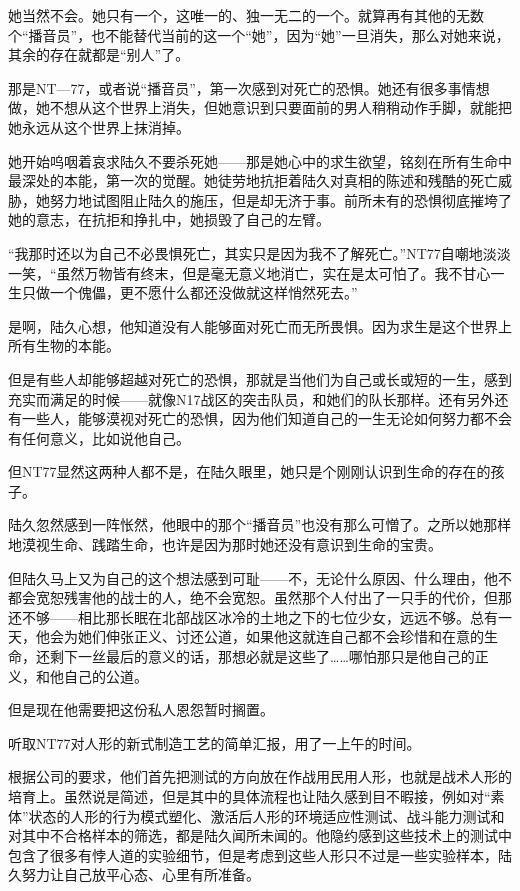 她当然不会。她只有一个，这唯一的、独一无二的一个。就算再有其他的无数个“播音员”，也不能替代当前的这一个“她”，因为“她”一旦消失，那么对她来说，其余的存在就都是“别人”了。

那是NT—77，或者说“播音员”，第一次感到对死亡的恐惧。她还有很多事情想做，她不想从这个世界上消失，但她意识到只要面前的男人稍稍动作手脚，就能把她永远从这个世界上抹消掉。

她开始呜咽着哀求陆久不要杀死她——那是她心中的求生欲望，铭刻在所有生命中最深处的本能，第一次的觉醒。她徒劳地抗拒着陆久对真相的陈述和残酷的死亡威胁，她努力地试图阻止陆久的施压，但是却无济于事。前所未有的恐惧彻底摧垮了她的意志，在抗拒和挣扎中，她损毁了自己的左臂。

“我那时还以为自己不必畏惧死亡，其实只是因为我不了解死亡。”NT77自嘲地淡淡一笑，“虽然万物皆有终末，但是毫无意义地消亡，实在是太可怕了。我不甘心一生只做一个傀儡，更不愿什么都还没做就这样悄然死去。”

是啊，陆久心想，他知道没有人能够面对死亡而无所畏惧。因为求生是这个世界上所有生物的本能。

但是有些人却能够超越对死亡的恐惧，那就是当他们为自己或长或短的一生，感到充实而满足的时候——就像N17战区的突击队员，和她们的队长那样。还有另外还有一些人，能够漠视对死亡的恐惧，因为他们知道自己的一生无论如何努力都不会有任何意义，比如说他自己。

但NT77显然这两种人都不是，在陆久眼里，她只是个刚刚认识到生命的存在的孩子。

陆久忽然感到一阵怅然，他眼中的那个“播音员”也没有那么可憎了。之所以她那样地漠视生命、践踏生命，也许是因为那时她还没有意识到生命的宝贵。

但陆久马上又为自己的这个想法感到可耻——不，无论什么原因、什么理由，他不都会宽恕残害他的战士的人，绝不会宽恕。虽然那个人付出了一只手的代价，但那还不够——相比那长眠在北部战区冰冷的土地之下的七位少女，远远不够。总有一天，他会为她们伸张正义、讨还公道，如果他这就连自己都不会珍惜和在意的生命，还剩下一丝最后的意义的话，那想必就是这些了……哪怕那只是他自己的正义，和他自己的公道。

但是现在他需要把这份私人恩怨暂时搁置。

听取NT77对人形的新式制造工艺的简单汇报，用了一上午的时间。

根据公司的要求，他们首先把测试的方向放在作战用民用人形，也就是战术人形的培育上。虽然说是简述，但是其中的具体流程也让陆久感到目不暇接，例如对“素体”状态的人形的行为模式塑化、激活后人形的环境适应性测试、战斗能力测试和对其中不合格样本的筛选，都是陆久闻所未闻的。他隐约感到这些技术上的测试中包含了很多有悖人道的实验细节，但是考虑到这些人形只不过是一些实验样本，陆久努力让自己放平心态、心里有所准备。


